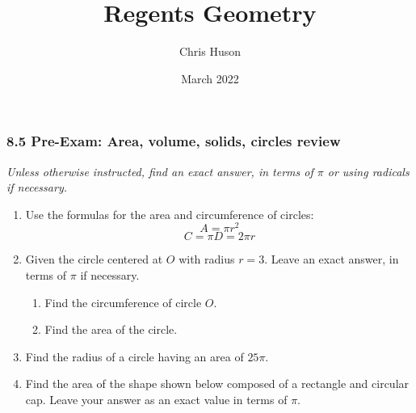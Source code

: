 \documentclass[12pt, twoside]{article}
\title{Regents Geometry}
\author{Chris Huson}
\date{March 2022}
\begin{document}
\subsubsection*{8.5 Pre-Exam: Area, volume, solids, circles review}
\emph{Unless otherwise instructed, find an exact answer, in terms of $\pi$ or using radicals if necessary.}
 \begin{enumerate}

  \item Use the formulas for the area and circumference of circles:
  \[A=\pi r^2\]
  \[C=\pi D = 2\pi r\]
  
  \item Given the circle centered at $O$ with radius $r=3$. Leave an exact answer, in terms of $\pi$ if necessary.
  \begin{multicols}{2}
    \begin{enumerate}
      \item Find the circumference of circle $O$. %
      \item Find the area of the circle.\vspace{2cm}
    \end{enumerate}
  \end{multicols}

  \item Find the radius of a circle having an area of $25 \pi$. \vspace{2cm}
  
  \item Find the area of the shape shown below composed of a rectangle and circular cap. Leave your answer as an exact value in terms of $\pi$.
    \begin{flushright}
  \end{flushright}\vspace{1cm}


\end{enumerate}
\end{document}

